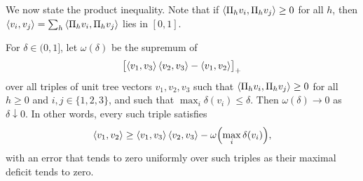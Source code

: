 We now state the product inequality. Note that if $\left\langle\Pi_hv_i,\Pi_hv_j\right\rangle\ge0$ for all $h$, then $\left\langle v_i,v_j\right\rangle=\sum_h\left\langle\Pi_hv_i,\Pi_hv_j\right\rangle$ lies in $[0,1]$.

\begin{theorem}
\label{thm:geometry-threshold-product}
For $\delta\in(0,1]$, let $\omega(\delta)$ be the supremum of
\[
 \bigl[\left\langle v_1,v_3\right\rangle\left\langle v_2,v_3\right\rangle-\left\langle v_1,v_2\right\rangle\bigr]_+
\]
over all triples of unit tree vectors $v_1,v_2,v_3$ such that $\left\langle\Pi_hv_i,\Pi_hv_j\right\rangle\ge0$ for all $h\ge0$ and $i,j\in\{1,2,3\}$, and such that $\max_i\delta(v_i)\le\delta$. Then $\omega(\delta)\to0$ as $\delta\downarrow0$. In other words, every such triple satisfies
\begin{equation}
 \left\langle v_1,v_2\right\rangle\ge
 \left\langle v_1,v_3\right\rangle\left\langle v_2,v_3\right\rangle-\omega\Bigl(\max_i\delta(v_i)\Bigr),
 \label{eq:geometry-threshold-product}
\end{equation}
with an error that tends to zero uniformly over such triples as their maximal deficit tends to zero.
\end{theorem}

